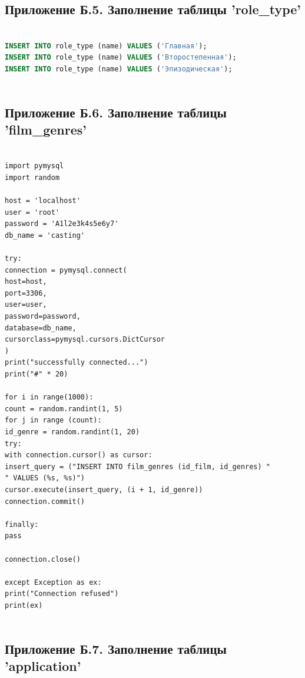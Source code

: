 \documentclass[11pt,a4paper,final]{article} %
\begin{document}
\subsection*{Приложение Б.5. Заполнение таблицы 'role\_type'}

\begin{lstlisting}[language=SQL]	
	
INSERT INTO role_type (name) VALUES ('Главная');
INSERT INTO role_type (name) VALUES ('Второстепенная');
INSERT INTO role_type (name) VALUES ('Эпизодическая');
	
\end{lstlisting}


\subsection*{Приложение Б.6. Заполнение таблицы 'film\_genres'}

\begin{lstlisting}	

import pymysql
import random

host = 'localhost'
user = 'root'
password = 'A1l2e3k4s5e6y7'
db_name = 'casting'

try:
connection = pymysql.connect(
host=host,
port=3306,
user=user,
password=password,
database=db_name,
cursorclass=pymysql.cursors.DictCursor
)
print("successfully connected...")
print("#" * 20)

for i in range(1000):
count = random.randint(1, 5)
for j in range (count):
id_genre = random.randint(1, 20)
try:
with connection.cursor() as cursor:
insert_query = ("INSERT INTO film_genres (id_film, id_genres) "
" VALUES (%s, %s)")
cursor.execute(insert_query, (i + 1, id_genre))
connection.commit()

finally:
pass

connection.close()

except Exception as ex:
print("Connection refused")
print(ex)	
	
\end{lstlisting}


\subsection*{Приложение Б.7. Заполнение таблицы 'application'}
	
\end{document}
